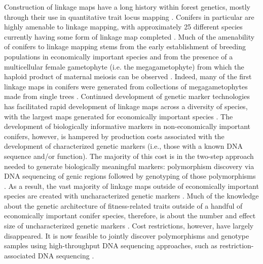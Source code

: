 \documentclass[11pt]{article}
\begin{document}
Construction of linkage maps have a long history within forest genetics, mostly through their use in quantitative trait locus mapping \citep{Ritland:2011}. 
Conifers in particular are highly amenable to linkage mapping, with approximately 25 different species currently having some 
form of linkage map completed \citep[see Table 5-1 in][]{Ritland:2011}. Much of the amenability of conifers to linkage mapping stems from 
the early establishment of breeding populations in economically important species and from the presence of a multicellular 
female gametophyte (i.e. the megagametophyte) from which the haploid product of maternal meiosis can be observed \citep{Cairney:2007}. Indeed, many of the first linkage maps in conifers were generated from collections of 
megagametophytes made from single trees \citep{Tulsieram:1992, Nelson:1993, Kubisiak:1996}. Continued development 
of genetic marker technologies has facilitated rapid development of linkage maps across a diversity of species, with the largest maps 
generated for economically important species \citep[e.g.][] {Achere:2004, Kang:2010, Martinez-Garcia:2013}. 
The development of biologically informative markers in non-economically important conifers, however, is hampered by production costs associated
with the development of characterized  genetic markers (i.e., those with a known DNA sequence and/or function). 
The majority of this cost is in the two-step approach needed to generate biologically 
meaningful markers: polymorphism discovery via DNA sequencing of genic regions followed by genotyping of those polymorphisms \citep[cf.][]{Eckert:2013a}. As a result, the vast majority of linkage maps outside of economically important 
species are created with uncharacterized genetic markers \citep[e.g.][]{Travis:1998}. Much of the knowledge about the genetic 
architecture of fitness-related traits outside of a handful of economically important conifer species, therefore, is about the 
number and effect size of uncharacterized genetic markers \citep{Ritland:2011}. Cost restrictions, however, have largely disappeared. 
It is now feasible to jointly discover polymorphisms and genotype samples using high-throughput DNA sequencing 
approaches, such as restriction-associated DNA sequencing \citep [RADseq; e.g.][] {Peterson:2012}. 
\end{document}

